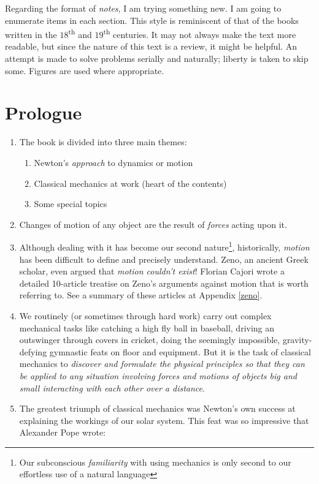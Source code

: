 \documentclass[12pt,a4paper]{report}
\begin{document}
Regarding the format of \emph{notes}, I am trying something new. I am going to enumerate items in each section. This style is reminiscent of that of the books written in the $18$\textsuperscript{th} and $19$\textsuperscript{th} centuries. It may not always make the text more readable, but since the nature of this text is a review, it might be helpful. An attempt is made to solve problems serially and naturally; liberty is taken to skip some. Figures are used where appropriate.

\chapter{Prologue}

\begin{enumerate}
    \item The book is divided into three main themes:
        \begin{enumerate}
            \item Newton's \emph{approach} to dynamics or motion
            \item Classical mechanics at work (heart of the contents)
            \item Some special topics
        \end{enumerate}
    \item Changes of motion of any object are the result of \emph{forces} acting upon it. 
    \item Although dealing with it has become our second nature\footnote{Our subconscious \emph{familiarity} with using mechanics is only second to our effortless use of a natural language}, historically, \emph{motion} has been difficult to define and precisely understand. Zeno, an ancient Greek scholar, even argued that \emph{motion couldn't exist}! Florian Cajori wrote a detailed 10-article treatise on Zeno's arguments against motion \cite{cajori-zeno} that is worth referring to. See a summary of these articles at Appendix \ref{zeno}.
    \item We routinely (or sometimes through hard work) carry out complex mechanical tasks like catching a high fly ball in baseball, driving an outswinger through covers in cricket, doing the seemingly impossible, gravity-defying gymnastic feats on floor and equipment. But it is the task of classical mechanics to \emph{discover and formulate the physical principles so that they can be applied to any situation involving forces and motions of objects big and small interacting with each other over a distance}. 
    \item The greatest triumph of classical mechanics was Newton's own success at explaining the workings of our solar system. This feat was so impressive that Alexander Pope wrote:


\end{enumerate}
\end{document}
